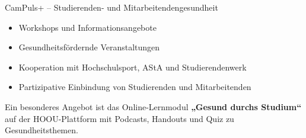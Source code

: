 \begin{initiativkarte}{CamPuls+ – Studierenden- und Mitarbeitendengesundheit}
  \begin{itemize}
    \item Workshops und Informationsangebote
    \item Gesundheitsfördernde Veranstaltungen
    \item Kooperation mit Hochschulsport, AStA und Studierendenwerk
    \item Partizipative Einbindung von Studierenden und Mitarbeitenden
  \end{itemize}

  \vspace{0.3cm}

  Ein besonderes Angebot ist das Online-Lernmodul \textbf{„Gesund durchs Studium“} auf der HOOU-Plattform mit Podcasts, Handouts und Quiz zu Gesundheitsthemen.

  \vspace{0.5cm}


  \vspace{0.6cm}
  \hawrule


\end{initiativkarte}